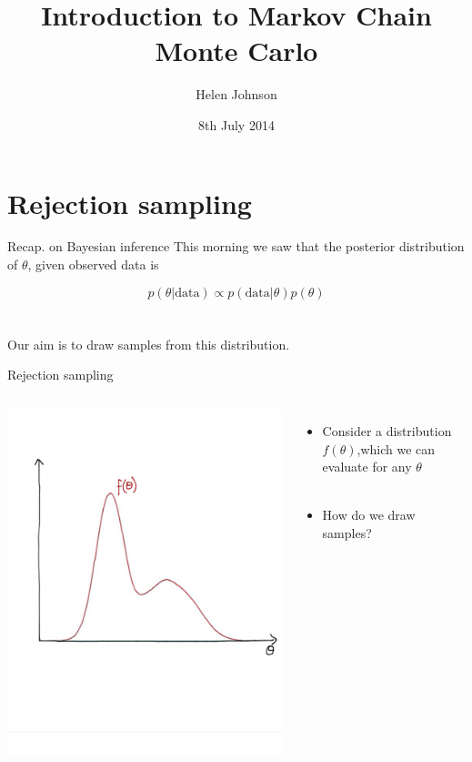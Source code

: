 \documentclass[compress]{beamer}
\title{Introduction to Markov Chain Monte Carlo}
\author{Helen Johnson}
\date{8th July 2014}
\begin{document}
\begin{frame}
\titlepage
\end{frame}

\section{Rejection sampling}
\label{sec-5}
\begin{frame}[label=sec-5-1]{Recap. on Bayesian inference}
This morning we saw that the \alert{posterior distribution} of $\theta$, given observed data is

$$ p(\theta | \text{data}) \propto p(\text{data}|\theta) p(\theta)$$\\~\\

Our aim is to draw samples from this distribution.
\end{frame}

\begin{frame}[label=sec-5-2]{Rejection sampling}
\begin{columns}[c] 
\includegraphics[width=1\linewidth]{RS1}

\begin{itemize}
\item Consider a distribution $f(\theta)$,which we can evaluate for any $\theta$\\~\\
\item How do we draw samples?
\end{itemize}
\end{columns}
\end{frame}
\end{document}
